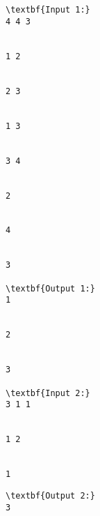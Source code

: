 \begin{verbatim}
\textbf{Input 1:}
4 4 3


1 2


2 3


1 3


3 4


2


4


3

\textbf{Output 1:}
1


2


3

\textbf{Input 2:}
3 1 1


1 2


1 \end{verbatim}
\begin{verbatim}
\textbf{Output 2:}
3\end{verbatim}